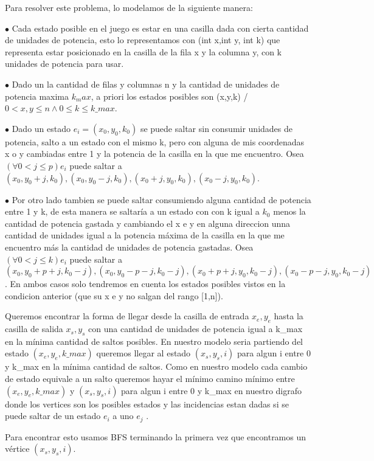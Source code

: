 Para resolver este problema, lo modelamos de la siguiente manera:

$\bullet$ Cada estado posible en el juego es estar en una casilla dada con cierta cantidad de unidades de potencia, esto lo representamos con (int x,int y, int k) que representa estar posicionado en la casilla de la fila x y la columna y, con k unidades de potencia para usar.

$\bullet$ Dado un la cantidad de filas y columnas n y la cantidad de unidades de potencia maxima $k_max$, a priori los estados posibles son (x,y,k) / $0 < x,y \leq n \wedge 0 \leq k \leq k\_max$. 

$\bullet$ Dado un estado $e_i = (x_0,y_0,k_0)$ se puede saltar sin consumir unidades de potencia, salto a un estado con el mismo k, pero con alguna de mis coordenadas x o y cambiadas entre 1 y la potencia de la casilla en la que me encuentro. Osea  $(\forall 0 < j \leq p ) e_i$ puede saltar a $(x_0,y_0+j,k_0), (x_0,y_0-j,k_0), (x_0+j,y_0,k_0), (x_0-j,y_0,k_0)$.

$\bullet$ Por otro lado tambien se puede saltar consumiendo alguna cantidad de potencia entre 1 y k, de esta manera se saltaría a un estado con con k igual a $k_0$ menos la cantidad de potencia gastada y cambiando el x e y en alguna direccion unna cantidad de unidades igual a la potencia máxima de la casilla en la que me encuentro más la cantidad de unidades de potencia gastadas. Osea $(\forall 0 < j \leq k ) e_i$ puede saltar a $(x_0,y_0+p+j,k_0-j), (x_0,y_0-p-j,k_0-j), (x_0+p+j,y_0,k_0-j), (x_0-p-j,y_0,k_0-j)$. En ambos casos solo tendremos en cuenta los estados posibles vistos en la condicion anterior (que su x e y no salgan del rango [1,n]).

Queremos encontrar la forma de llegar desde la casilla de entrada $x_e,y_e$ hasta la casilla de salida $x_s,y_s$ con una cantidad de unidades de potencia igual a k\_max en la mínima cantidad de saltos posibles. En nuestro modelo seria partiendo del estado $(x_e,y_e,k\_max)$ queremos llegar al estado $(x_s,y_s,i)$ para algun i entre 0 y k\_max en la mínima cantidad de saltos. Como en nuestro modelo cada cambio de estado equivale a un salto queremos hayar el mínimo camino mínimo entre $(x_e,y_e,k\_max)$ y $(x_s,y_s,i)$ para algun i entre 0 y k\_max en nuestro digrafo donde los vertices son los posibles estados y las incidencias estan dadas si se puede saltar de un estado $e_i$ a uno $e_j$ .

Para encontrar esto usamos BFS terminando la primera vez que encontramos un vértice $(x_s,y_s,i)$.




